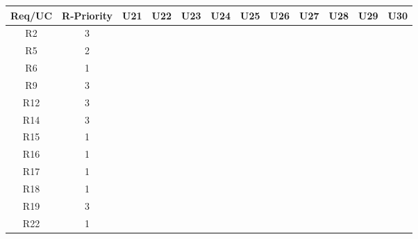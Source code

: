 \documentclass[12pt]{article}
\begin{document}
\newpage
\begin{longtable}{|c|c|c|c|c|c|c|c|c|c|c|c|}
	\hline
	Req/UC      & R-Priority & U21      & U22      & U23      & U24      & U25      & U26      & U27      & U28      & U29      & U30      \\
	\hline
	R2          & 3          &           &           &           &           &           &           &           &           &           &           \\
	\hline
	R5          & 2          &           &           &           &           &           &           &           &           &           &           \\
	\hline
	R6          & 1          &           &           &           &           &           &           &           &           &           &           \\
	\hline
	R9          & 3          &           &           &           &           &           &           &           &           &           &           \\
	\hline
	R12         & 3          &           &           &           &           &           &           &           &           &           &           \\
	\hline
	R14         & 3          &           &           &           &           &           &           &           &           &           &           \\
	\hline
	R15         & 1          &           &           &           &           &           &           &           &           &           &           \\
	\hline
	R16         & 1          &           &           &           &           &           &           &           &           &           &           \\
	\hline
	R17         & 1          &           &           &           &           &           &           &           &           &           &           \\
	\hline
	R18         & 1          &           &           &           &           &           &           &           &           &           &           \\
	\hline
	R19         & 3          &           &           &           &           &           &           &           &           &           &           \\
	\hline
	R22         & 1          &           &           &           &           &           &           &           &           &           &           \\

\end{longtable}
\end{document}
